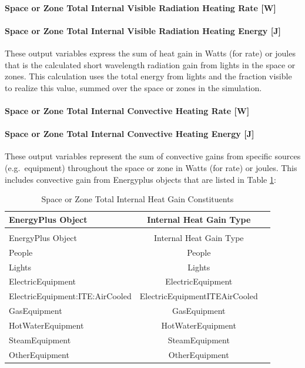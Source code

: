 \paragraph{Space or Zone Total Internal Visible Radiation Heating Rate {[}W{]}}\label{zone-total-internal-visible-radiation-heating-rate-w}

\paragraph{Space or Zone Total Internal Visible Radiation Heating Energy {[}J{]}}\label{zone-total-internal-visible-radiation-heating-energy-j}

These output variables express the sum of heat gain in Watts (for rate) or joules that is the calculated short wavelength radiation gain from lights in the space or zones. This calculation uses the total energy from lights and the fraction visible to realize this value, summed over the space or zones in the simulation.

\paragraph{Space or Zone Total Internal Convective Heating Rate {[}W{]}}\label{zone-total-internal-convective-heating-rate-w}

\paragraph{Space or Zone Total Internal Convective Heating Energy {[}J{]}}\label{zone-total-internal-convective-heating-energy-j}

These output variables represent the sum of convective gains from specific sources (e.g.~equipment) throughout the space or zone in Watts (for rate) or joules. This includes convective gain from Energyplus objects that are listed in Table \ref{table:space-or-zone-total-internal-heat-gain-constituents}: 

\begin{longtable}[c]{@{}lcc@{}}
	\caption{Space or Zone Total Internal Heat Gain Constituents} \label{table:space-or-zone-total-internal-heat-gain-constituents} \tabularnewline
	\toprule
	EnergyPlus Object &  Internal Heat Gain Type \tabularnewline
	\midrule
	\endfirsthead
	
	\caption[]{Space or Zone Total Internal Heat Gain Constituents} \tabularnewline
	\toprule
	EnergyPlus Object &  Internal Heat Gain Type \tabularnewline
	\midrule
	\endhead
	
	People   &  People \tabularnewline
	Lights   &  Lights \tabularnewline
	ElectricEquipment   &  ElectricEquipment \tabularnewline
	ElectricEquipment:ITE:AirCooled   &  ElectricEquipmentITEAirCooled \tabularnewline
	GasEquipment   &  GasEquipment \tabularnewline
	HotWaterEquipment   &  HotWaterEquipment \tabularnewline
	SteamEquipment   &  SteamEquipment \tabularnewline
	OtherEquipment   &  OtherEquipment \tabularnewline
	
	\bottomrule

\end{longtable}

